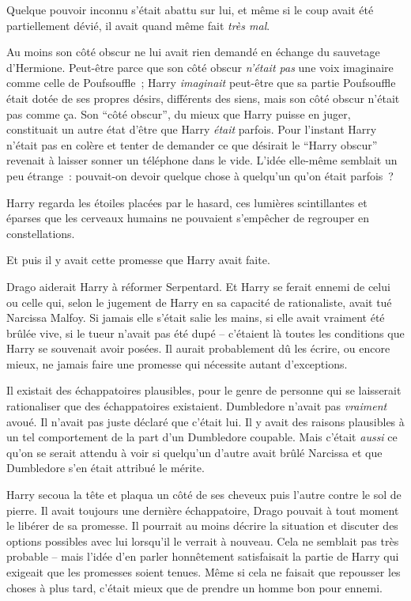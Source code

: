 Quelque pouvoir inconnu s'était abattu sur lui, et même si le coup avait été partiellement dévié, il avait quand même fait \emph{très mal}.

Au moins son côté obscur ne lui avait rien demandé en échange du sauvetage d'Hermione. Peut-être parce que son côté obscur \emph{n'était pas} une voix imaginaire comme celle de Poufsouffle~; Harry \emph{imaginait} peut-être que sa partie Poufsouffle était dotée de ses propres désirs, différents des siens, mais son côté obscur n'était pas comme ça. Son “côté obscur”, du mieux que Harry puisse en juger, constituait un autre état d'être que Harry \emph{était} parfois. Pour l'instant Harry n'était pas en colère et tenter de demander ce que désirait le “Harry obscur” revenait à laisser sonner un téléphone dans le vide. L'idée elle-même semblait un peu étrange~: pouvait-on devoir quelque chose à quelqu'un qu'on était parfois~?

Harry regarda les étoiles placées par le hasard, ces lumières scintillantes et éparses que les cerveaux humains ne pouvaient s'empêcher de regrouper en constellations.

Et puis il y avait cette promesse que Harry avait faite.

Drago aiderait Harry à réformer Serpentard. Et Harry se ferait ennemi de celui ou celle qui, selon le jugement de Harry en sa capacité de rationaliste, avait tué Narcissa Malfoy. Si jamais elle s'était salie les mains, si elle avait vraiment été brûlée vive, si le tueur n'avait pas été dupé -- c'étaient là toutes les conditions que Harry se souvenait avoir posées. Il aurait probablement dû les écrire, ou encore mieux, ne jamais faire une promesse qui nécessite autant d'exceptions.

Il existait des échappatoires plausibles, pour le genre de personne qui se laisserait rationaliser que des échappatoires existaient. Dumbledore n'avait pas \emph{vraiment} avoué. Il n'avait pas juste déclaré que c'était lui. Il y avait des raisons plausibles à un tel comportement de la part d'un Dumbledore coupable. Mais c'était \emph{aussi} ce qu'on se serait attendu à voir si quelqu'un d'autre avait brûlé Narcissa et que Dumbledore s'en était attribué le mérite.

Harry secoua la tête et plaqua un côté de ses cheveux puis l'autre contre le sol de pierre. Il avait toujours une dernière échappatoire, Drago pouvait à tout moment le libérer de sa promesse. Il pourrait au moins décrire la situation et discuter des options possibles avec lui lorsqu'il le verrait à nouveau. Cela ne semblait pas très probable -- mais l'idée d'en parler honnêtement satisfaisait la partie de Harry qui exigeait que les promesses soient tenues. Même si cela ne faisait que repousser les choses à plus tard, c'était mieux que de prendre un homme bon pour ennemi.

